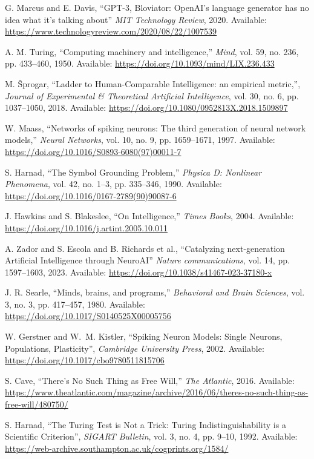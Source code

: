 \documentclass{article}
\begin{document}
\begin{thebibliography}{99}

G. Marcus and E. Davis,
``GPT-3, Bloviator: OpenAI’s language generator has no idea what it’s talking about''
\textit{MIT Technology Review}, 2020. Available:
\url{https://www.technologyreview.com/2020/08/22/1007539}

A. M. Turing, 
``Computing machinery and intelligence,'' 
\textit{Mind}, vol. 59, no. 236, pp. 433--460, 1950. Available: \url{https://doi.org/10.1093/mind/LIX.236.433}

M. Šprogar, 
``Ladder to Human-Comparable Intelligence: an empirical metric,'', 
\textit{Journal of Experimental \& Theoretical Artificial Intelligence},
vol. 30, no. 6, pp. 1037--1050, 2018. Available: \url{https://doi.org/10.1080/0952813X.2018.1509897}

W. Maass, 
``Networks of spiking neurons: The third generation of neural network models,'' 
\textit{Neural Networks}, vol. 10, no. 9, pp. 1659--1671, 1997. Available: \url{https://doi.org/10.1016/S0893-6080(97)00011-7}

S. Harnad, 
``The Symbol Grounding Problem,'' 
\textit{Physica D: Nonlinear Phenomena}, vol. 42, no. 1--3, pp. 335--346, 1990. Available: \url{https://doi.org/10.1016/0167-2789(90)90087-6}

J. Hawkins and S. Blakeslee,
``On Intelligence,'' 
\textit{Times Books}, 2004. Available: \url{https://doi.org/10.1016/j.artint.2005.10.011}

A. Zador and S. Escola and B. Richards et al.,
``Catalyzing next-generation Artificial Intelligence through NeuroAI''
\textit{Nature communications}, vol. 14, pp. 1597--1603, 2023. Available:
\url{https://doi.org/10.1038/s41467-023-37180-x}

J. R. Searle, 
``Minds, brains, and programs,'' 
\textit{Behavioral and Brain Sciences}, vol. 3, no. 3, pp. 417--457, 1980. Available: \url{https://doi.org/10.1017/S0140525X00005756}

W. Gerstner and W.~M. Kistler,
``Spiking Neuron Models: Single Neurons, Populations, Plasticity'',
\textit{Cambridge University Press}, 2002. Available:
\url{https://doi.org/10.1017/cbo9780511815706}

S. Cave, 
``There’s No Such Thing as Free Will,''
\textit{The Atlantic},
2016. Available: \url{https://www.theatlantic.com/magazine/archive/2016/06/theres-no-such-thing-as-free-will/480750/}

S. Harnad,
``The Turing Test is Not a Trick: Turing Indistinguishability is a Scientific Criterion'',
\textit{SIGART Bulletin}, vol. 3, no. 4, pp. 9--10, 1992. Available: \url{https://web-archive.southampton.ac.uk/cogprints.org/1584/}

\end{thebibliography}
\end{document}
